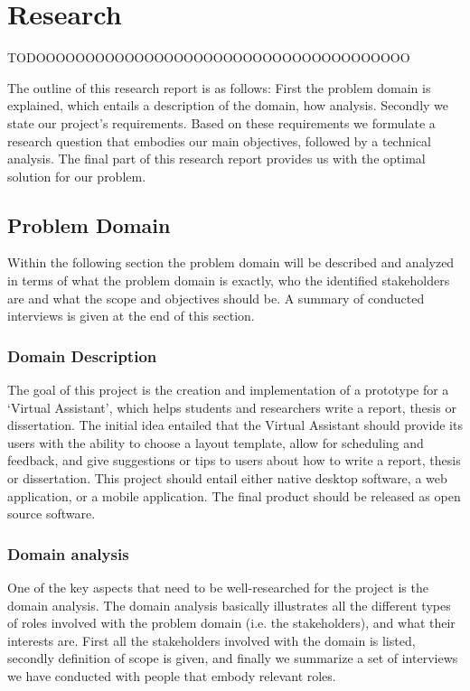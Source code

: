 \chapter{Research}

TODOOOOOOOOOOOOOOOOOOOOOOOOOOOOOOOOOOOOOO

The outline of this research report is as follows: First the problem domain is explained, which entails a description of the domain, how   analysis. Secondly we state our project's requirements. Based on these requirements we formulate a research question that embodies our main objectives, followed by a technical analysis. The final part of this research report provides us with the optimal solution for our problem.


\section{Problem Domain} %
\label{sec:problem_domain}


Within the following section the problem domain will be described and analyzed in terms of what the problem domain is exactly, who the identified stakeholders are and what the scope and objectives should be. A summary of conducted interviews is given at the end of this section.

\subsection{Domain Description} %
\label{sub:problem_description}

The goal of this project is the creation and implementation of a prototype for a `Virtual Assistant', which helps students and researchers write a report, thesis or dissertation. The initial idea entailed that the Virtual Assistant should provide its users with the ability to choose a layout template, allow for scheduling and feedback, and give suggestions or tips to users about how to write a report, thesis or dissertation.
This project should entail either native desktop software, a web application, or a mobile application. The final product should be released as open source software.

\subsection{Domain analysis} %

One of the key aspects that need to be well-researched for the project is the domain analysis. The domain analysis basically illustrates all the different types of roles involved with the problem domain (i.e. the stakeholders), and what their interests are. First all the stakeholders involved with the domain is listed, secondly definition of scope is given, and finally we summarize a set of interviews we have conducted with people that embody relevant roles.

